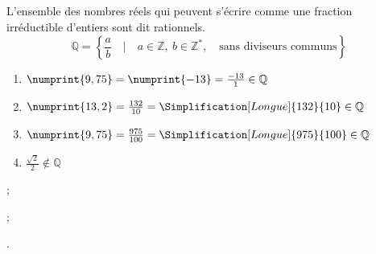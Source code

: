 \documentclass[main.tex]{subfiles}
\begin{document}
\begin{definition}
	L'ensemble des nombres réels qui peuvent s'écrire comme une fraction irréductible d'entiers sont dit rationnels.  
	\setlength{\abovedisplayskip}{3pt}
	\setlength{\belowdisplayskip}{3pt}
	$$ \mathbb{Q}=\left\{\dfrac{a}{b} \quad \big| \quad a\in\mathbb{Z},~b\in\mathbb{Z}^* , \quad\text{sans diviseurs communs}\right\}
$$
\end{definition}\vspace{-1em}
\begin{example} \hfill  
		\begin{enumerate}[label={\alph*)\rule{0pt}{1.8em}},leftmargin=*] 
			\item $\numprint{9,75} =\numprint{-13}  = \frac{-13}{1}\in\mathbb{Q} $
			\item $\numprint{13,2} = \frac{132}{10}=\Simplification[Longue]{132}{10}\in\mathbb{Q}$
			\item $\numprint{9,75} =\frac{975}{100}=\Simplification[Longue]{975}{100}\in\mathbb{Q}$
			\item $\frac{\sqrt{2}}{2}\notin \mathbb{Q}$
		\end{enumerate}  
\end{example} 
\begin{example} \hfill 
	
	 ; 
	
	;
	
	. 
	
	

\end{example} 
\end{document}
